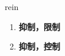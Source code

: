 
\begin{frame}
{\huge rein}
\begin{center}
\begin{enumerate}\Large
  \item \textbf{抑制，限制}
  \item \textbf{抑制，控制}
\end{enumerate}
\end{center}
\end{frame}
